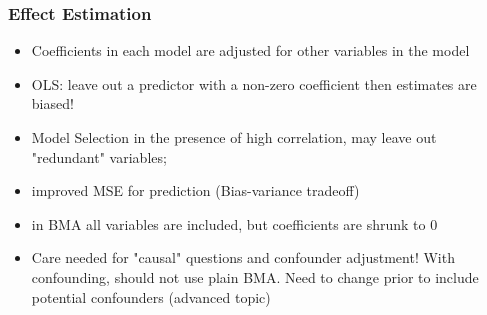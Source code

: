 \documentclass[]{beamer}
\begin{document}
\begin{frame}
  \frametitle{Effect Estimation}
  \begin{itemize}
  \item  Coefficients in each model are adjusted for other variables
    in the model
\item OLS:  leave out a predictor with a non-zero coefficient then
  estimates are biased!
\item Model Selection in the presence of high correlation, may leave
  out "redundant" variables;
\item improved MSE for prediction (Bias-variance tradeoff)

\item in BMA all variables are included, but coefficients are
   shrunk to 0
\item Care needed for "causal" questions   and confounder adjustment!    With confounding, should not use plain BMA.  Need to change prior to
  include potential confounders  (advanced topic)

  \end{itemize}


\end{frame}
\end{document}
